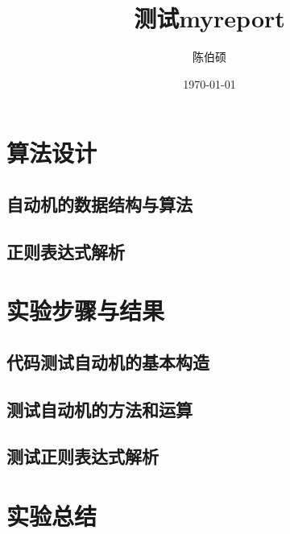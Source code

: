 \documentclass[pdfCover]{myreport} %
\title{测试myreport}
\author{陈伯硕}
\date{\today}
\begin{document}
\maketitle
\pagestyle{empty}

\setcounter{section}{3}
\section{算法设计}
  \subsection{自动机的数据结构与算法}
    
  \subsection{正则表达式解析}
    

\section{实验步骤与结果}
  \subsection{代码测试自动机的基本构造}
    
  \subsection{测试自动机的方法和运算}
    
  \subsection{测试正则表达式解析}
    




\section{实验总结}
  


\end{document}
